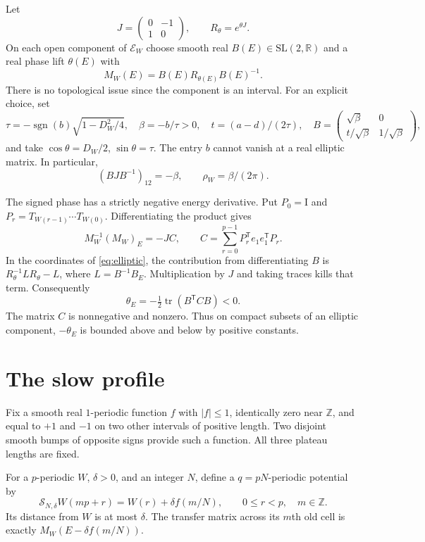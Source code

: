 \documentclass[11pt,a4paper]{article}
\numberwithin{equation}{section}
\theoremstyle{remark}
\newcommand{\R}{\mathbb R}
\newcommand{\Z}{\mathbb Z}
\newcommand{\Id}{\mathrm I}
\newcommand{\tr}{\operatorname{tr}}
\newcommand{\SL}{\mathrm{SL}}
\begin{document}
Let
\[
J=\begin{pmatrix}0&-1\\1&0\end{pmatrix},\qquad R_\theta=e^{\theta J}.
\]
On each open component of $\mathcal E_W$ choose smooth real
$B(E)\in\SL(2,\R)$ and a real phase lift $\theta(E)$ with
\begin{equation}\label{eq:elliptic}
M_W(E)=B(E)R_{\theta(E)}B(E)^{-1}.
\end{equation}
There is no topological issue since the component is an interval.
For an explicit choice, set
\[
\tau=-\operatorname{sgn}(b)\sqrt{1-D_W^2/4},\quad
\beta=-b/\tau>0,\quad t=(a-d)/(2\tau),\quad
B=\begin{pmatrix}\sqrt\beta&0\\t/\sqrt\beta&1/\sqrt\beta\end{pmatrix},
\]
and take $\cos\theta=D_W/2$, $\sin\theta=\tau$.
The entry $b$ cannot vanish at a real elliptic matrix. In particular,
\begin{equation}\label{eq:beta}
(BJB^{-1})_{12}=-\beta,\qquad \rho_W=\beta/(2\pi).
\end{equation}

The signed phase has a strictly negative energy derivative.
Put $P_0=\Id$ and $P_r=T_{W(r-1)}\cdots T_{W(0)}$.
Differentiating the product gives
\[
M_W^{-1}(M_W)_E=-JC,\qquad
C=\sum_{r=0}^{p-1}P_r^{\mathsf T}e_1e_1^{\mathsf T}P_r.
\]
In the coordinates of \eqref{eq:elliptic}, the contribution from
differentiating $B$ is $R_\theta^{-1}LR_\theta-L$, where
$L=B^{-1}B_E$. Multiplication by $J$ and taking traces kills
that term. Consequently
\begin{equation}\label{eq:phase}
\theta_E=-\tfrac12\tr(B^{\mathsf T}CB)<0.
\end{equation}
The matrix $C$ is nonnegative and nonzero. Thus on compact
subsets of an elliptic component, $-\theta_E$ is bounded
above and below by positive constants.

\section{The slow profile}
Fix a smooth real $1$-periodic function $f$ with $|f|\le1$,
identically zero near $\Z$, and equal to $+1$ and $-1$
on two other intervals of positive length. Two disjoint
smooth bumps of opposite signs provide such a function.
All three plateau lengths are fixed.

For a $p$-periodic $W$, $\delta>0$, and an integer $N$, define
a $q=pN$-periodic potential by
\begin{equation}\label{eq:slow}
\mathcal S_{N,\delta}W(mp+r)=W(r)+\delta f(m/N),
\qquad 0\le r<p,\quad m\in\Z.
\end{equation}
Its distance from $W$ is at most $\delta$. The transfer matrix
across its $m$th old cell is exactly $M_W(E-\delta f(m/N))$.
\end{document}
